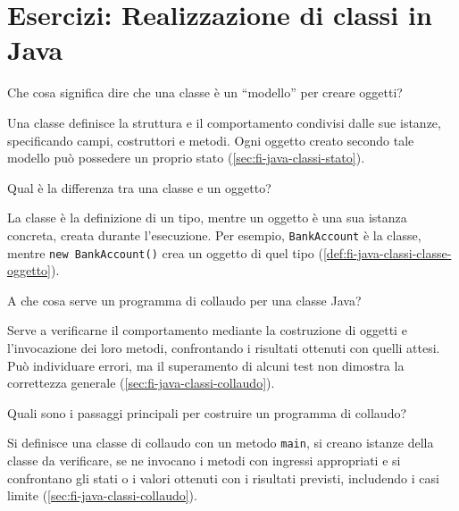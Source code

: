\chapter{Esercizi: Realizzazione di classi in Java}
\label{chap:esercizi-realizzazione-classi-java}

\begin{exercise}
\label{ex:fi-esercizi-java-classi-modello}
Che cosa significa dire che una classe è un ``modello'' per creare oggetti?
\end{exercise}

Una classe definisce la struttura e il comportamento condivisi dalle
sue istanze, specificando campi, costruttori e metodi. Ogni oggetto
creato secondo tale modello può possedere un proprio stato
(\cref{sec:fi-java-classi-stato}).

\begin{exercise}
\label{ex:fi-esercizi-java-classi-classe-oggetto}
Qual è la differenza tra una classe e un oggetto?
\end{exercise}

La classe è la definizione di un tipo, mentre un oggetto è una sua
istanza concreta, creata durante l'esecuzione. Per esempio,
\texttt{BankAccount} è la classe, mentre
\texttt{new BankAccount()} crea un oggetto di quel tipo
(\cref{def:fi-java-classi-classe-oggetto}).

\begin{exercise}
\label{ex:fi-esercizi-java-classi-collaudo-scopo}
A che cosa serve un programma di collaudo per una classe Java?
\end{exercise}

Serve a verificarne il comportamento mediante la costruzione di
oggetti e l'invocazione dei loro metodi, confrontando i risultati
ottenuti con quelli attesi. Può individuare errori, ma il superamento
di alcuni test non dimostra la correttezza generale
(\cref{sec:fi-java-classi-collaudo}).

\begin{exercise}
\label{ex:fi-esercizi-java-classi-collaudo-passi}
Quali sono i passaggi principali per costruire un programma di collaudo?
\end{exercise}

Si definisce una classe di collaudo con un metodo \texttt{main},
si creano istanze della classe da verificare, se ne invocano i
metodi con ingressi appropriati e si confrontano gli stati o i
valori ottenuti con i risultati previsti, includendo i casi limite
(\cref{sec:fi-java-classi-collaudo}).

